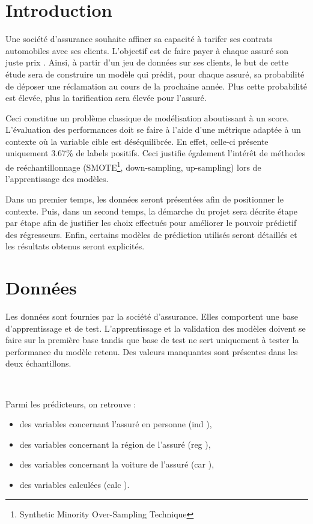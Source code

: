 \documentclass[french]{article}
\begin{document}
\begin{multicols}{2}
\section{Introduction}


Une société d'assurance souhaite affiner sa capacité à tarifer ses contrats automobiles avec ses clients. L'objectif est de faire payer à chaque assuré son \og juste prix \fg{}. Ainsi, à partir d'un jeu de données sur ses clients, le but de cette étude sera de construire un modèle qui prédit, pour chaque assuré, sa probabilité de déposer une réclamation au cours de la prochaine année. Plus cette probabilité est élevée, plus la tarification sera élevée pour l'assuré.


Ceci constitue un problème classique de modélisation aboutissant à un score. L'évaluation des performances doit se faire à l'aide d'une métrique adaptée à un contexte où la variable cible est déséquilibrée. En effet, celle-ci présente uniquement 3.67\% de labels positifs. Ceci justifie également l'intérêt de méthodes de reéchantillonnage (SMOTE\footnote{Synthetic Minority Over-Sampling Technique}, down-sampling, up-sampling) lors de l'apprentissage des modèles.

Dans un premier temps, les données seront présentées afin de positionner le contexte. Puis, dans un second temps, la démarche du projet sera décrite étape par étape afin de justifier les choix effectués pour améliorer le pouvoir prédictif des régresseurs. Enfin, certains modèles de prédiction utilisés seront détaillés et les résultats obtenus seront explicités.

\section{Données}

Les données sont fournies par la société d'assurance. Elles comportent une base d'apprentissage et de test. L'apprentissage et la validation des modèles doivent se faire sur la première base tandis que base de test ne sert uniquement à tester la performance du modèle retenu. Des valeurs manquantes sont présentes dans les deux échantillons.

\

\noindent Parmi les prédicteurs, on retrouve :
\begin{itemize}
    \item des variables concernant l'assuré en personne (\og ind \fg{}),
    \item des variables concernant la région de l'assuré (\og reg \fg{}),
    \item des variables concernant la voiture de l'assuré (\og car \fg{}),
    \item des variables calculées (\og calc \fg{}).
\end{itemize}


\end{multicols}
\end{document}
